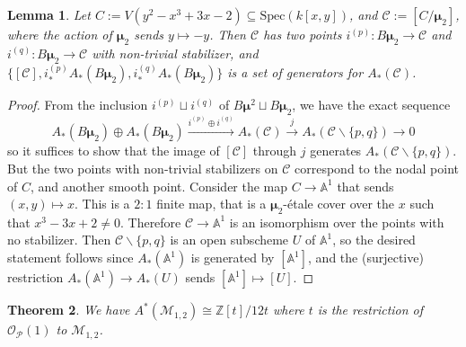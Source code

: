 \documentclass[11pt]{amsart}
\newtheorem{theorem}{Theorem}[section]
\newtheorem{lemma}[theorem]{Lemma}
\theoremstyle{definition}
\theoremstyle{remark}
\newcommand{\bA}{{\mathbb A}}
\newcommand{\calO}{\mathcal O}
\newcommand{\calM}{\mathcal M}
\newcommand{\calC}{\mathcal C}
\newcommand{\calP}{\mathcal P}
\newcommand{\bmu}{\boldsymbol{\mu}}
\newcommand{\Spec}{\mathrm{Spec}}
\begin{document}
\begin{lemma}\label{lemma_generators_chow_nodal_Stacky_curve}
Let $C:=V(y^2-x^3 + 3x -2)\subseteq \Spec(k[x,y])$, and $\calC:=[C/\bmu_2]$, where the action of $\bmu_2$ sends $y\mapsto -y$. Then $\calC$ has two
points $i^{(p)}:B\bmu_2 \to \calC$ and $i^{(q)}:B\bmu_2 \to \calC$ with non-trivial stabilizer, and $ \{[\calC],i^{(p)}_*A_*(B\bmu_2),i^{(q)}_*A_*(B\bmu_2)\}$ is a set of generators for $A_*(\calC)$.  
\end{lemma}
\begin{proof}
From the inclusion $i^{(p)}\sqcup i^{(q)}$ of $B\bmu^2 \sqcup B\bmu_2$, we have the exact sequence 
$$A_*(B\bmu_2)\oplus A_*(B\bmu_2) \xrightarrow{i^{(p)}\oplus i^{(q)}} A_*(\calC) \xrightarrow{j} A_*(\calC\smallsetminus \{p,q\})\to 0$$
so it suffices to show that the image of $[\calC]$ through $j$ generates $A_*(\calC\smallsetminus \{p,q\})$. But the two points with non-trivial stabilizers on $\calC$ correspond to the nodal point of $C$, and another smooth point. Consider the map $C\to \mathbb{A}^1$ that sends $(x,y)\mapsto x$. This is a $2:1$ finite map, that is a $\bmu_2$-\'etale cover over the $x$ such that $x^3-3x+2\neq 0$. Therefore $\calC\to \mathbb{A}^1$ is an isomorphism over the points with no stabilizer. Then
$\calC\smallsetminus \{p,q\}$ is an open subscheme $U$ of $\mathbb{A}^1$, so the desired statement follows since $A_*(\bA^1)$ is generated by $[\bA^1]$, and the (surjective) restriction $A_*(\bA^1)\to A_*(U)$ sends $[\bA^1]\mapsto [U]$.
\end{proof}
\begin{theorem}\label{theorem_chow_ring_m1,2} We have $A^*(\calM_{1,2})\cong\mathbb{Z}[t]/12t$ where $t$ is the restriction of $\calO_\calP(1)$ to $\calM_{1,2}$.
\end{theorem}
\end{document}
